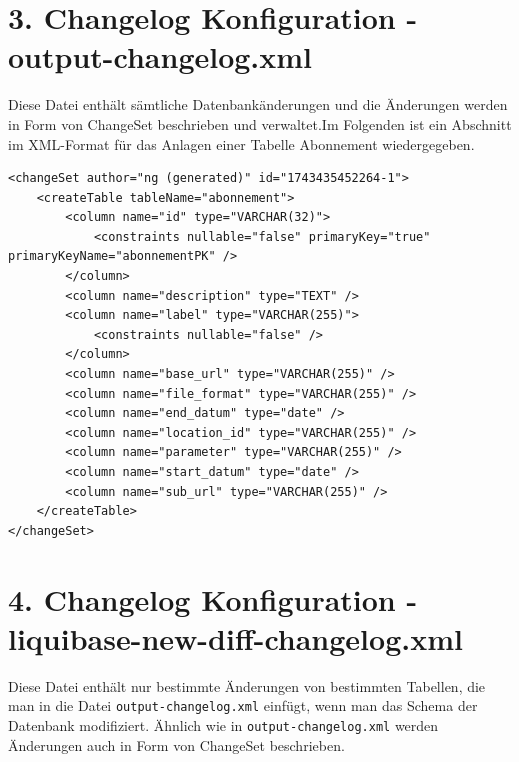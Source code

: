 \documentclass[a4paper,12pt]{scrreprt}
\begin{document}
\section*{\small \textbf{3. Changelog Konfiguration - output-changelog.xml}}
Diese Datei enthält sämtliche Datenbankänderungen und die Änderungen werden in Form von ChangeSet beschrieben und verwaltet.Im Folgenden ist ein Abschnitt im XML-Format für das Anlagen einer Tabelle Abonnement wiedergegeben. \\ 
\begin{lstlisting}
<changeSet author="ng (generated)" id="1743435452264-1">
    <createTable tableName="abonnement">
        <column name="id" type="VARCHAR(32)">
            <constraints nullable="false" primaryKey="true" primaryKeyName="abonnementPK" />
        </column>
        <column name="description" type="TEXT" />
        <column name="label" type="VARCHAR(255)">
            <constraints nullable="false" />
        </column>
        <column name="base_url" type="VARCHAR(255)" />
        <column name="file_format" type="VARCHAR(255)" />
        <column name="end_datum" type="date" />
        <column name="location_id" type="VARCHAR(255)" />
        <column name="parameter" type="VARCHAR(255)" />
        <column name="start_datum" type="date" />
        <column name="sub_url" type="VARCHAR(255)" />
    </createTable>
</changeSet>
\end{lstlisting}
\section*{\small \textbf{4. Changelog Konfiguration - liquibase-new-diff-changelog.xml}}
Diese Datei enthält nur bestimmte Änderungen von bestimmten Tabellen, die man in die Datei \texttt{output-changelog.xml} einfügt, wenn man das Schema der Datenbank modifiziert. Ähnlich wie in \texttt{output-changelog.xml} werden Änderungen auch in Form von ChangeSet beschrieben.
\end{document}
